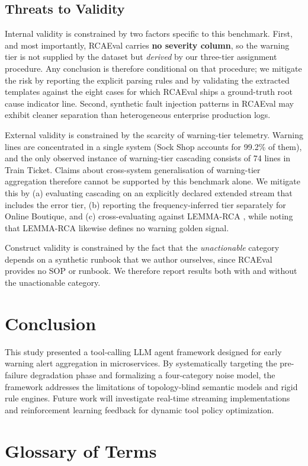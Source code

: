 \documentclass[conference]{IEEEtran}
\begin{document}
\subsection{Threats to Validity}
Internal validity is constrained by two factors specific to this benchmark. First, and most importantly, RCAEval carries \textbf{no severity column}, so the warning tier is not supplied by the dataset but \emph{derived} by our three-tier assignment procedure. Any conclusion is therefore conditional on that procedure; we mitigate the risk by reporting the explicit parsing rules and by validating the extracted templates against the eight cases for which RCAEval ships a ground-truth root cause indicator line. Second, synthetic fault injection patterns in RCAEval may exhibit cleaner separation than heterogeneous enterprise production logs.

External validity is constrained by the scarcity of warning-tier telemetry. Warning lines are concentrated in a single system (Sock Shop accounts for 99.2\% of them), and the only observed instance of warning-tier cascading consists of 74 lines in Train Ticket. Claims about cross-system generalisation of warning-tier aggregation therefore cannot be supported by this benchmark alone. We mitigate this by (a) evaluating cascading on an explicitly declared extended stream that includes the error tier, (b) reporting the frequency-inferred tier separately for Online Boutique, and (c) cross-evaluating against LEMMA-RCA \cite{zheng2024lemma}, while noting that LEMMA-RCA likewise defines no warning golden signal.

Construct validity is constrained by the fact that the \emph{unactionable} category depends on a synthetic runbook that we author ourselves, since RCAEval provides no SOP or runbook. We therefore report results both with and without the unactionable category.

\section{Conclusion}
This study presented a tool-calling LLM agent framework designed for early warning alert aggregation in microservices. By systematically targeting the pre-failure degradation phase and formalizing a four-category noise model, the framework addresses the limitations of topology-blind semantic models and rigid rule engines. Future work will investigate real-time streaming implementations and reinforcement learning feedback for dynamic tool policy optimization.

\appendix
\section*{Glossary of Terms}




\end{document}
